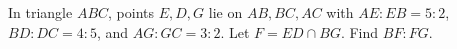 In triangle $ABC$, points $E,D,G$ lie on $AB,BC,AC$ with $AE:EB=5:2$, $BD:DC=4:5$, and $AG:GC=3:2$. Let $F=ED\cap BG$. Find $BF:FG$.
